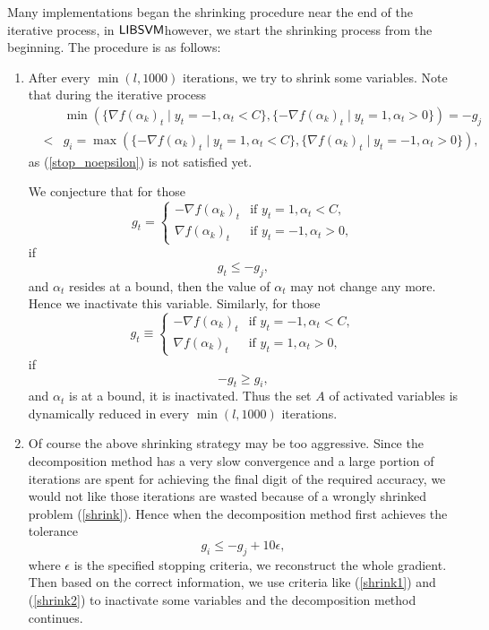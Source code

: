 \documentclass[11pt]{article}
\newcommand{\libsvm}{$\mbox{{\sf LIBSVM}}$}
\theoremstyle{break}
\begin{document}
Many implementations began the shrinking 
procedure near the end of the
iterative process,
in \libsvm however, we start the shrinking 
process from the 
beginning.
The procedure is as follows:
\begin{enumerate}
\item 
\label{do_shrink}
After every $\min(l, 1000)$
iterations, we try to shrink 
some variables.
Note that during the iterative
process
\begin{eqnarray}
&& \min
(\{\nabla f(\alpha_k)_t 
\mid
y_t  = -1, \alpha_t < C\},
\{-\nabla f(\alpha_k)_t 
\mid
y_t  = 1, \alpha_t > 0\})
= -g_j \nonumber \\
& < & g_i = 
\max
(\{-\nabla f(\alpha_k)_t 
\mid
y_t  = 1, \alpha_t < C\},
\{\nabla f(\alpha_k)_t 
\mid
y_t  = -1, \alpha_t > 0\}), 
\label{gji}
\end{eqnarray}
as (\ref{stop_noepsilon})
is not satisfied yet.

We conjecture that for those
\begin{equation}
\label{shrink1}
g_{t} 
= \begin{cases}
-\nabla f(\alpha_k)_{t}
& \mbox{if }
y_{t} = 1, \alpha_{t} < C,\\
\nabla f(\alpha_k)_{t}
& \mbox{if }
y_{t} = -1, \alpha_{t} > 0,
\end{cases}
\end{equation}
if 
\begin{equation}
g_t \leq -g_j,
\label{gtj}
\end{equation}
and $\alpha_t$
resides at a bound, then
the value of 
$\alpha_t$ may not change any more.
Hence we inactivate this variable.
Similarly, for those
\begin{equation}
\label{shrink2}
g_{t} 
\equiv \begin{cases}
-\nabla f(\alpha_k)_{t}
& \mbox{if }
y_{t} = -1, \alpha_{t} < C,\\
\nabla f(\alpha_k)_{t}
& \mbox{if }
y_{t} = 1, \alpha_{t} > 0,
\end{cases}
\end{equation}
if 
\begin{equation}
-g_t \geq g_i,  
\label{gti}
\end{equation}
and $\alpha_t$ is at a bound, it
is inactivated.
Thus the set $A$ of activated variables 
is dynamically reduced in 
every $\min(l,1000)$ iterations.

\item Of course the above shrinking
strategy may be too aggressive.
Since the decomposition method has 
a very slow convergence and
a large portion of 
iterations are spent for achieving 
the final digit of the required
accuracy, we 
would not like those iterations are wasted 
because of 
a wrongly shrinked problem
(\ref{shrink}). Hence when the
decomposition method first achieves 
the tolerance
\begin{equation*}
g_{i}  \leq - g_{j} + 10\epsilon,
\end{equation*}
where $\epsilon$ is the specified
stopping criteria, we reconstruct
the whole gradient.  Then based on the
correct information, we use criteria
like (\ref{shrink1}) and (\ref{shrink2})
to inactivate some variables and
the
decomposition method continues.
\end{enumerate}
\end{document}
